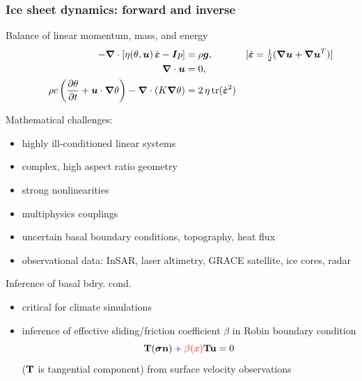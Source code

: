 \documentclass[10pt,final,xcolor=dvipsnames]{beamer}
\newcommand{\gbf}[1]{\boldsymbol{#1}}
\newcommand{\bs}[1]{\ensuremath{\boldsymbol{#1}}}
\newcommand{\edot}{\dot{\gbf{\varepsilon}}}
\newcommand{\tcr}[1]{\ensuremath{\textcolor{red}{{#1}}}}
\begin{document}
\begin{frame}
\frametitle{Ice sheet dynamics: forward and inverse}

\begin{block}{Balance of linear momentum, mass, and energy}
  \[
  \begin{aligned}
    - \gbf{\nabla} \cdot \left[ \eta(\theta,\gbf{u}) \, \edot
      -\gbf{I}p \right] &= \rho \gbf{g},
    &[\edot = \tfrac 12  (\gbf{\nabla u} + \gbf{\nabla  u}^T)]
    \hspace{-2em}
    \\
    \gbf{\nabla} \cdot \gbf{u} &= 0,
    \vspace{-2em} \\
    \rho c \left(\frac{\partial \theta}{\partial t} + \gbf{u} \cdot \gbf{\nabla}
    \theta\right)  - \gbf{\nabla} \cdot (K \gbf{\nabla} \theta)
    &= 2 \, \eta \, \mathrm{tr}(\edot^2)
  \end{aligned}
  \]
\end{block}
\vspace{0.2cm}
\begin{minipage}{.49\columnwidth}
  \alert{Mathematical challenges:}
  \begin{itemize}
    \small
  \item highly ill-conditioned linear systems
  \item complex, high aspect ratio geometry
  \item strong nonlinearities
  \item multiphysics couplings
  \item uncertain \alert{basal boundary conditions}, topography,
    heat flux
  \item observational data: InSAR, laser altimetry, GRACE
    satellite, ice cores, radar
  \end{itemize}
\end{minipage}
\begin{minipage}{.48\columnwidth}
  \alert{Inference of basal bdry. cond.}
  \begin{itemize}
    \small
  \item critical for climate simulations %
  \item inference of effective sliding/friction coefficient $\beta$ in
    Robin boundary condition
    \begin{equation*}
      {\bf T}(\bs \sigma {\bf n}) + \tcr{\beta (x)}{\bf T}{\bf u} = 0
    \end{equation*}
    ($\bf T$ is tangential component)  from
    surface velocity observations
  \end{itemize}
\end{minipage}
\end{frame}
\end{document}
